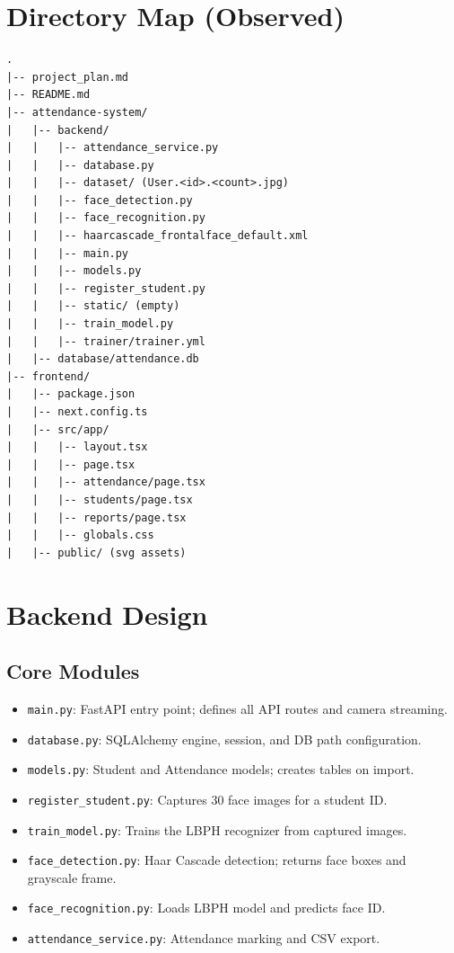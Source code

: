 \documentclass[11pt]{article}
\begin{document}
\section*{Directory Map (Observed)}
\begin{verbatim}
.
|-- project_plan.md
|-- README.md
|-- attendance-system/
|   |-- backend/
|   |   |-- attendance_service.py
|   |   |-- database.py
|   |   |-- dataset/ (User.<id>.<count>.jpg)
|   |   |-- face_detection.py
|   |   |-- face_recognition.py
|   |   |-- haarcascade_frontalface_default.xml
|   |   |-- main.py
|   |   |-- models.py
|   |   |-- register_student.py
|   |   |-- static/ (empty)
|   |   |-- train_model.py
|   |   |-- trainer/trainer.yml
|   |-- database/attendance.db
|-- frontend/
|   |-- package.json
|   |-- next.config.ts
|   |-- src/app/
|   |   |-- layout.tsx
|   |   |-- page.tsx
|   |   |-- attendance/page.tsx
|   |   |-- students/page.tsx
|   |   |-- reports/page.tsx
|   |   |-- globals.css
|   |-- public/ (svg assets)
\end{verbatim}

\section*{Backend Design}
\subsection*{Core Modules}
\begin{itemize}[leftmargin=*]
  \item \texttt{main.py}: FastAPI entry point; defines all API routes and camera streaming.
  \item \texttt{database.py}: SQLAlchemy engine, session, and DB path configuration.
  \item \texttt{models.py}: Student and Attendance models; creates tables on import.
  \item \texttt{register\_student.py}: Captures 30 face images for a student ID.
  \item \texttt{train\_model.py}: Trains the LBPH recognizer from captured images.
  \item \texttt{face\_detection.py}: Haar Cascade detection; returns face boxes and grayscale frame.
  \item \texttt{face\_recognition.py}: Loads LBPH model and predicts face ID.
  \item \texttt{attendance\_service.py}: Attendance marking and CSV export.
\end{itemize}
\end{document}
